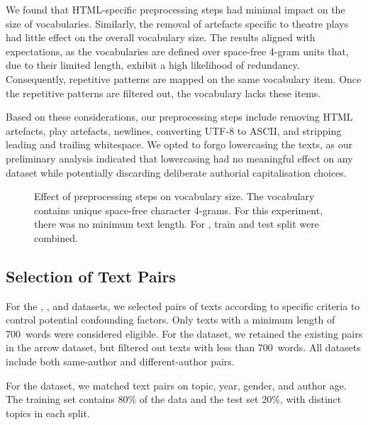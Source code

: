 We found that HTML-specific preprocessing steps had minimal impact on the size of vocabularies.
Similarly, the removal of artefacts specific to theatre plays had little effect on the overall vocabulary size.
The results aligned with expectations, as the vocabularies are defined over space-free 4-gram units that, due to their limited length, exhibit a high likelihood of redundancy.
Consequently, repetitive patterns are mapped on the same vocabulary item.
Once the repetitive patterns are filtered out, the vocabulary lacks these items.

Based on these considerations, our preprocessing steps include removing HTML artefacts, play artefacts, newlines, converting UTF-8 to ASCII, and stripping leading and trailing whitespace.
We opted to forgo lowercasing the texts, as our preliminary analysis indicated that lowercasing had no meaningful effect on any dataset while potentially discarding deliberate authorial capitalisation choices.

\begin{figure}[htbp]
    \centering
    
    \caption[Effect of preprocessing steps on vocabulary size]{Effect of preprocessing steps on vocabulary size. The vocabulary contains unique space-free character 4-grams.
    For this experiment, there was no minimum text length.
    For \dataPan{}, train and test split were combined.}
    \label{fig:preprocesing_impact_vocab_size}
\end{figure}


\subsection{Selection of Text Pairs}
\label{subsec:dataset_text_pair_selection}

For the \dataBlog{}, \dataStudent{}, and \dataGutenberg{} datasets, we selected pairs of texts according to specific criteria to control potential confounding factors.
Only texts with a minimum length of \num{700}~words were considered eligible. 
For the \dataPan{} dataset, we retained the existing pairs in the arrow dataset, but filtered out texts with less than \num{700}~words. 
All datasets include both same-author and different-author pairs. 

For the \dataBlog{} dataset, we matched text pairs on topic, year, gender, and author age. The training set contains 80\% of the data and the test set 20\%, with distinct topics in each split.

